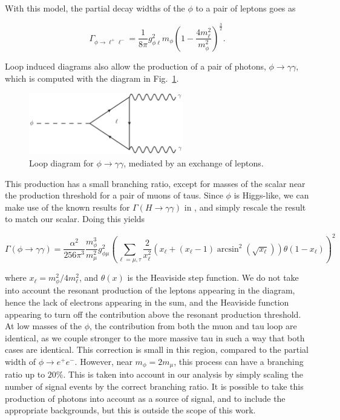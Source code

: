 With this model, the partial decay widths of the $\phi$ to a pair of leptons goes as

\begin{equation}
    \Gamma_{\phi \rightarrow \ell^+ \ell^-} = \frac{1}{8\pi} g_{\phi\ell}^2 m_\phi \left(1-\frac{4m_\ell^2}{m_\phi^2}\right)^{\frac{3}{2}}\textrm{.}
\end{equation}

Loop induced diagrams also allow the production of a pair of photons, $\phi \rightarrow \gamma \gamma$, which is computed with the diagram in Fig.~\ref{fig:phi_gammagamma_loop}.

\begin{figure}[h]
    \centering
    \includegraphics[width = 0.6\textwidth]{Figures/feynman_diagrams/phi_gammagamma}
    \caption{Loop diagram for $\phi \rightarrow \gamma \gamma$, mediated by an exchange of leptons.}
    \label{fig:phi_gammagamma_loop}
\end{figure}

\noindent This production has a small branching ratio, except for masses of the scalar near the production threshold for a pair of muons of taus.
Since $\phi$ is Higgs-like, we can make use of the known results for $\Gamma\left(H \rightarrow \gamma \gamma\right)$ in \cite{Djouadi:2005gi}, and simply rescale the result to match our scalar.
Doing this yields

\begin{equation}
    \Gamma\left(\phi \rightarrow \gamma \gamma\right) = \frac{\alpha^2}{256 \pi^3} \frac{m_\phi^3}{m_\mu^2} g_{\phi \mu}^2 \left( \sum_{\ell = \mu, \tau} \frac{2}{x_\ell^2}\left( x_\ell + (x_\ell-1) \arcsin^2\left( \sqrt{x_\ell} \right) \right) \theta(1-x_\ell) \right)^2
\end{equation}

\noindent where $x_\ell = m_\phi^2 / 4 m_\ell^2$, and $\theta(x)$ is the Heaviside step function.
We do not take into account the resonant production of the leptons appearing in the diagram, hence the lack of electrons appearing in the sum, and the Heaviside function appearing to turn off the contribution above the resonant production threshold.
At low masses of the $\phi$, the contribution from both the muon and tau loop are identical, as we couple stronger to the more massive tau in such a way that both cases are identical.
This correction is small in this region, compared to the partial width of $\phi \rightarrow e^+ e^-$.
However, near $m_\phi = 2m_\mu$, this process can have a branching ratio up to $20\%$.
This is taken into account in our analysis by simply scaling the number of signal events by the correct branching ratio.
It is possible to take this production of photons into account as a source of signal, and to include the appropriate backgrounds, but this is outside the scope of this work.

